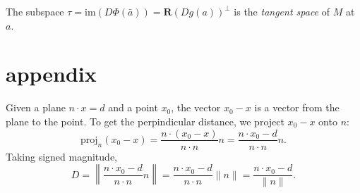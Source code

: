\documentclass[12pt]{article}
\begin{document}
\begin{remark}
	The subspace $\tau=\text{im}(D\Phi(\bar{a}))=\mathbf{R}(Dg(a))^\perp$ is the \emph{tangent space} of $M$ at $a$.
\end{remark}



\section{appendix} %

Given a plane $n\cdot x=d$ and a point $x_0$, the vector $x_0-x$ is a vector from the plane to the point. To get the perpindicular distance, we project $x_0-x$ onto $n$:
\begin{equation*}
	\text{proj}_n(x_0-x)=\frac{n\cdot (x_0-x)}{n\cdot n}n = \frac{n\cdot x_0-d}{n\cdot n}n.
\end{equation*}
Taking signed magnitude, 
\begin{equation*}
	D = \left\| \frac{n\cdot x_0-d}{n\cdot n}n\right\| = \frac{n\cdot x_0-d}{n\cdot n}\|n\|=\frac{n\cdot x_0-d}{\|n\|}.
\end{equation*}

\end{document}
